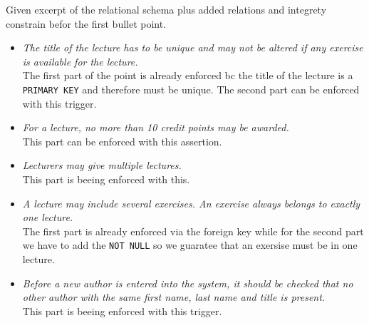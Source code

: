 \documentclass{article}
\begin{document}
\printfront


\task{}
Given excerpt of the relational schema plus added relations and integrety constrain befor the first bullet point.

\newpage
\begin{itemize}
    \item 
    \textit{The title of the lecture has to be unique and may not be altered if any exercise is
    available for the lecture.}\\
    The first part of the point is already enforced bc the title of the lecture is a \texttt{PRIMARY KEY} and therefore must be unique. The second part can be enforced with this trigger.
    
    \item 
    \textit{For a lecture, no more than 10 credit points may be awarded.}\\
    This part can be enforced with this assertion.
    
    \item 
    \textit{Lecturers may give multiple lectures.}\\
    This part is beeing enforced with this.
    
    \item 
    \textit{A lecture may include several exercises. An exercise always belongs to exactly one
    lecture.}\\
    The first part is already enforced via the foreign key while for the second part we have to add the \texttt{NOT NULL} so we guaratee that an exersise must be in one lecture.
    
    \item 
    \textit{Before a new author is entered into the system, it should be checked that no other
    author with the same first name, last name and title is present.}\\
    This part is beeing enforced with this trigger.
    

\end{itemize}


\end{document}

